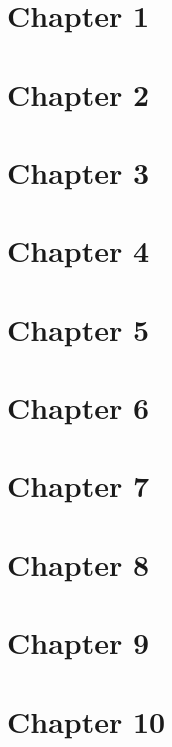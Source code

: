 \documentclass[12pt]{book}
\begin{document}
\section{Chapter 1}
\section{Chapter 2}
\section{Chapter 3}
\section{Chapter 4}
\section{Chapter 5}
\section{Chapter 6}
\section{Chapter 7}
\section{Chapter 8}
\section{Chapter 9}
\section{Chapter 10}
\end{document}
